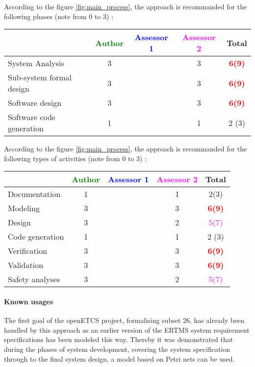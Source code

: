 According to the figure \ref{fig:main_process}, the approach is recommanded for the following phases (note from 0 to  3) :

\begin{tabular}{|l | c | c | c | c|}
\hline
& \textcolor{green}{Author} & \textcolor{blue}{Assessor 1} & \textcolor{magenta}{Assessor 2} & Total \\
\hline 
System Analysis & 3     & & 3     & \textcolor{red}{\textbf{6(9)}}  \\
\hline
Sub-system formal design & 3     & & 3     & \textcolor{red}{\textbf{6(9)}}  \\
\hline
Software design & 3     & & 3     & \textcolor{red}{\textbf{6(9)}}  \\
\hline
Software code generation & 1     & & 1     & 2 (3) \\
\hline
\end{tabular}

According to the figure \ref{fig:main_process}, the approach is recommanded for the following types of activities (note from 0 to  3) :

\begin{tabular}{|l | c | c | c | c|}
\hline
& \textcolor{green}{Author} & \textcolor{blue}{Assessor 1} & \textcolor{magenta}{Assessor 2} & Total \\
\hline 
Documentation & 1     & & 1     &  2(3) \\
\hline
Modeling & 3     & & 3     &  \textcolor{red}{\textbf{6(9)}}  \\
\hline
Design & 3     & & 2     & \textcolor{magenta}{5(7)}  \\
\hline
Code generation & 1     & & 1     & 2 (3) \\
\hline
Verification & 3     & & 3     & \textcolor{red}{\textbf{6(9)}}  \\
\hline
Validation & 3     & & 3     & \textcolor{red}{\textbf{6(9)}}  \\
\hline
Safety analyses & 3     & & 2     & \textcolor{magenta}{5(7)}  \\
\hline
\end{tabular}

\paragraph{Known usages} 

The first goal of the openETCS project, formalising subset 26, has already been handled by this approach as  an earlier version of the ERTMS system requirement specifications has been modeled this way. Thereby it  was  demonstrated  that  during  the  phases  of  system development, covering the system specification through to the final system design, a  model based on Petri nets can be used.

